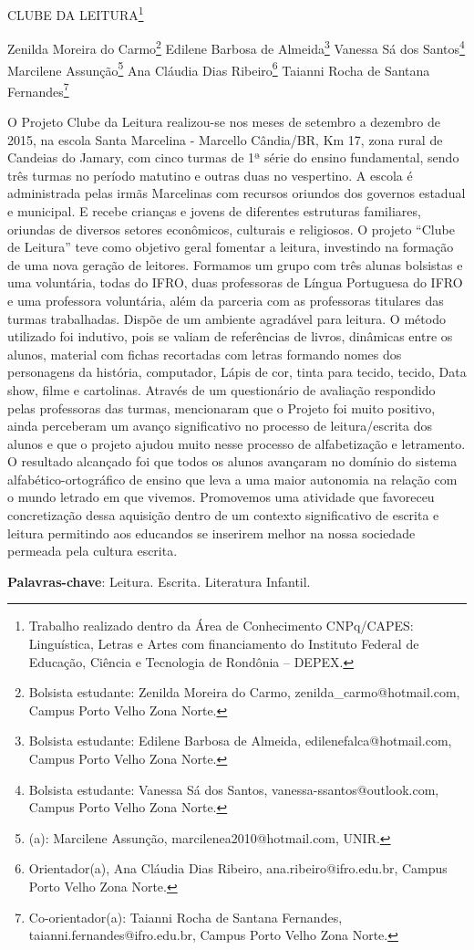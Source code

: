 \documentclass[article,12pt,onesidea,4paper,english,brazil]{abntex2}
\begin{document}
	
	
	\frenchspacing 
	
	\begin{center}
		\LARGE CLUBE DA LEITURA\footnote{Trabalho realizado dentro da Área de Conhecimento CNPq/CAPES: Linguística, Letras e Artes com financiamento do Instituto Federal de Educação, Ciência e Tecnologia de Rondônia – DEPEX.}
		
		\normalsize
		Zenilda Moreira do Carmo\footnote{Bolsista estudante: Zenilda Moreira do Carmo, zenilda\_carmo@hotmail.com, Campus Porto Velho Zona Norte. } 
		Edilene Barbosa de Almeida\footnote{Bolsista estudante: Edilene Barbosa de Almeida, edilenefalca@hotmail.com, Campus Porto Velho Zona Norte.} 
		Vanessa Sá dos Santos\footnote{Bolsista estudante: Vanessa Sá dos Santos, vanessa-ssantos@outlook.com, Campus Porto Velho Zona Norte.} \\
		Marcilene Assunção\footnote{(a): Marcilene Assunção, marcilenea2010@hotmail.com, UNIR.} 
		Ana Cláudia Dias Ribeiro\footnote{Orientador(a), Ana Cláudia Dias Ribeiro, ana.ribeiro@ifro.edu.br, Campus Porto Velho Zona Norte. }
		Taianni Rocha de Santana Fernandes\footnote{Co-orientador(a): Taianni Rocha de Santana Fernandes, taianni.fernandes@ifro.edu.br, Campus Porto Velho Zona Norte.}
	\end{center}
	
	\noindent O Projeto Clube da Leitura realizou-se nos meses de setembro a dezembro de 2015, na escola Santa Marcelina - Marcello Cândia/BR, Km 17, zona rural de Candeias do Jamary, com cinco turmas de 1ª série do ensino fundamental, sendo três turmas no período matutino e outras duas no vespertino. A escola é administrada pelas irmãs Marcelinas com recursos oriundos dos governos estadual e municipal. E recebe crianças e jovens de diferentes estruturas familiares, oriundas de diversos setores econômicos, culturais e religiosos. O projeto “Clube de Leitura” teve como objetivo geral fomentar a leitura, investindo na formação de uma nova geração de leitores. Formamos um grupo com três alunas bolsistas e uma voluntária, todas do IFRO, duas professoras de Língua Portuguesa do IFRO e uma professora voluntária, além da parceria com as professoras titulares das turmas trabalhadas. Dispõe de um ambiente agradável para leitura. O método utilizado foi indutivo, pois se valiam de referências de livros, dinâmicas entre os alunos, material com fichas recortadas com letras formando nomes dos personagens da história, computador, Lápis de cor, tinta para tecido, tecido, Data show, filme e cartolinas. Através de um questionário de avaliação respondido pelas professoras das turmas, mencionaram que o Projeto foi muito positivo, ainda perceberam um avanço significativo no processo de leitura/escrita dos alunos e que o projeto ajudou muito nesse processo de alfabetização e letramento. O resultado alcançado foi que todos os alunos avançaram no domínio do sistema alfabético-ortográfico de ensino que leva a uma maior autonomia na relação com o mundo letrado em que vivemos. Promovemos uma atividade que favoreceu concretização dessa aquisição dentro de um contexto significativo de escrita e leitura permitindo aos educandos se inserirem melhor na nossa sociedade permeada pela cultura escrita.
	
	\vspace{\onelineskip}
	
	\noindent
	\textbf{Palavras-chave}: Leitura. Escrita. Literatura Infantil.
	
\end{document}
